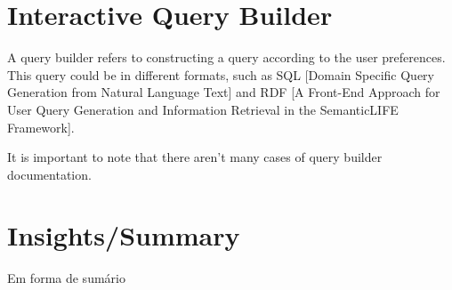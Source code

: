 

\section{Interactive Query Builder}

A query builder refers to constructing a query according to the user preferences. This query could be in different formats, such as SQL [Domain Specific Query Generation from Natural Language Text] and RDF [A Front-End Approach for User Query Generation and Information Retrieval in the SemanticLIFE Framework]. 

It is important to note that there aren't many cases of query builder documentation.


\section{Insights/Summary}

Em forma de sumário